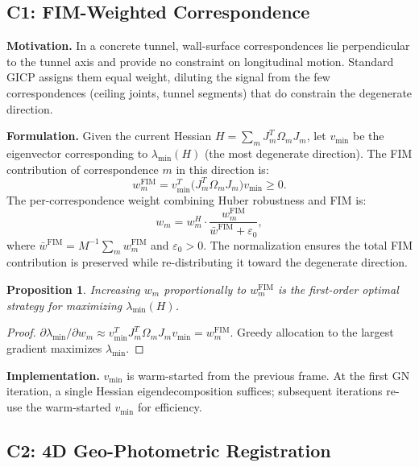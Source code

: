 \documentclass[letterpaper, 10pt, conference]{ieeeconf}
\newtheorem{proposition}{Proposition}
\newcommand{\vmin}{v_{\min}}
\begin{document}
\subsection{C1: FIM-Weighted Correspondence}\label{sec:c1}

\textbf{Motivation.}
In a concrete tunnel, wall-surface correspondences lie perpendicular to the
tunnel axis and provide no constraint on longitudinal motion.
Standard GICP assigns them equal weight, diluting the signal from the few
correspondences (ceiling joints, tunnel segments) that do constrain the
degenerate direction.

\textbf{Formulation.}
Given the current Hessian $H = \sum_m J_m^T\Omega_m J_m$, let
$\vmin$ be the eigenvector corresponding to $\lambda_{\min}(H)$
(the most degenerate direction).
The FIM contribution of correspondence $m$ in this direction is:
\begin{equation}
  w_m^{\mathrm{FIM}} = \vmin^T \bigl(J_m^T \Omega_m J_m\bigr) \vmin \geq 0.
  \label{eq:c1_fim}
\end{equation}
The per-correspondence weight combining Huber robustness and FIM is:
\begin{equation}
  \boxed{w_m = w_m^H \cdot \frac{w_m^{\mathrm{FIM}}}{\bar{w}^{\mathrm{FIM}} + \varepsilon_0}},
  \label{eq:c1_weight}
\end{equation}
where $\bar{w}^{\mathrm{FIM}} = M^{-1}\sum_m w_m^{\mathrm{FIM}}$ and $\varepsilon_0 > 0$.
The normalization ensures the total FIM contribution is preserved while
re-distributing it toward the degenerate direction.

\begin{proposition}
Increasing $w_m$ proportionally to $w_m^{\mathrm{FIM}}$ is the first-order
optimal strategy for maximizing $\lambda_{\min}(H)$.
\end{proposition}
\begin{proof}
$\partial\lambda_{\min}/\partial w_m \approx \vmin^T J_m^T\Omega_m J_m\vmin = w_m^{\mathrm{FIM}}$.
Greedy allocation to the largest gradient maximizes $\lambda_{\min}$.
\end{proof}

\textbf{Implementation.}
$\vmin$ is warm-started from the previous frame.
At the first GN iteration, a single Hessian eigendecomposition suffices;
subsequent iterations re-use the warm-started $\vmin$ for efficiency.

\subsection{C2: 4D Geo-Photometric Registration}\label{sec:c2}
\end{document}
